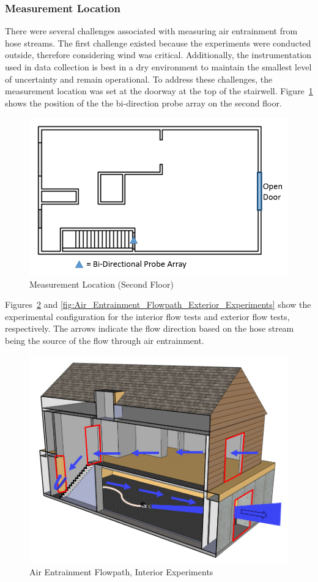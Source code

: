 \documentclass{article}
\begin{document}
\subsubsection{Measurement Location}
There were several challenges associated with measuring air entrainment from hose streams. The first challenge existed because the experiments were conducted outside, therefore considering wind was critical. Additionally, the instrumentation used in data collection is best in a dry environment to maintain the smallest level of uncertainty and remain operational. To address these challenges, the measurement location was set at the doorway at the top of the stairwell. Figure~\ref{fig:Measurement_Location_Second_Floor} shows the position of the the bi-direction probe array on the second floor.

\begin{figure}[!ht]
	\centering
	\includegraphics[width=.6\columnwidth]{Figures/Air_Entrainment/Measurement_Locations_Secondfloor}
	\caption{Measurement Location (Second Floor)}
	\label{fig:Measurement_Location_Second_Floor}
\end{figure}

Figures~\ref{fig:Air_Entrainment_Flowpath_Interior_Experiments} and \ref{fig:Air_Entrainment_Flowpath_Exterior_Experiments} show the experimental configuration for the interior flow tests and exterior flow tests, respectively. The arrows indicate the flow direction based on the hose stream being the source of the flow through air entrainment.

\begin{figure}[!ht]
	\centering
	\includegraphics[width=.7\columnwidth]{Figures/Air_Entrainment/Airflow_Layout}
	\caption{Air Entrainment Flowpath, Interior Experiments}
	\label{fig:Air_Entrainment_Flowpath_Interior_Experiments}
\end{figure}
\end{document}

